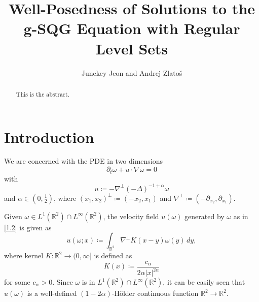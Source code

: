 \documentclass[reqno,centertags,12pt]{amsart}
\theoremstyle{definition}
\numberwithin{equation}{section}
\newcommand{\abs}[1]{\left\lvert#1\right\rvert}
\newcommand{\bbR}{{\mathbb{R}}}
\begin{document}
\title[Solutions to the g-SQG Equation with Regular Level Sets]
{Well-Posedness of Solutions to the g-SQG Equation with Regular Level Sets}

\author{Junekey Jeon and Andrej Zlato\v{s}}

\address{\noindent Department of Mathematics \\ University of
California San Diego \\ La Jolla, CA 92093 \newline Email: \tt
zlatos@ucsd.edu,
j6jeon@ucsd.edu}


\begin{abstract}
    This is the abstract.
\end{abstract}

\maketitle

\section{Introduction}

We are concerned with the PDE in two dimensions
\begin{equation}\label{1.1}
    \partial_{t}\omega + u\cdot\nabla\omega = 0
\end{equation}
with
\begin{equation}\label{1.2}
    u \coloneqq -\nabla^{\perp}(-\Delta)^{-1+\alpha}\omega
\end{equation}
and $\alpha\in\left(0,\frac{1}{2}\right)$, where
$(x_{1},x_{2})^{\perp}\coloneqq(-x_{2},x_{1})$ and
$\nabla^{\perp}\coloneqq(-\partial_{x_{2}},\partial_{x_{1}})$.

Given $\omega\in L^{1}(\bbR^{2})\cap L^{\infty}(\bbR^{2})$,
the velocity field $u(\omega)$ generated by $\omega$ as in \eqref{1.2} is given as
\[
    u(\omega;x) \coloneqq \int_{\bbR^{2}}
    \nabla^{\perp}K(x - y)\omega(y)\,dy,
\]
where kernel $K\colon \bbR^{2}\to(0,\infty]$ is defined as
\[
    K(x)\coloneqq \frac{c_{\alpha}}{2\alpha\abs{x}^{2\alpha}}
\]
for some $c_{\alpha}>0$. Since $\omega$ is in $L^{1}(\bbR^{2})\cap L^{\infty}(\bbR^{2})$,
it can be easily seen that $u(\omega)$ is
a well-defined $(1-2\alpha)$-H\"{o}lder continuous function $\bbR^{2}\to\bbR^{2}$.
\end{document}
